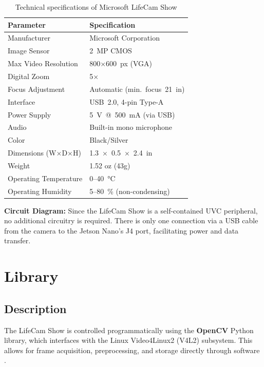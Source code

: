 \begin{table}[H]
	\centering
	\caption{Technical specifications of Microsoft LifeCam Show \cite{microsoft_lifecam_datasheet,techradar_lifecam_review}}
	\label{tab:lifecam_specs}
	\begin{tabular}{|p{4cm}|p{10cm}|}
		\hline
		\textbf{Parameter} & \textbf{Specification} \\ \hline
		Manufacturer & Microsoft Corporation \\ \hline
		Image Sensor & 2~MP \ac{CMOS} \\ \hline
		Max Video Resolution & 800$\times$600~px (VGA) \\ \hline
		Digital Zoom & 5$\times$ \\ \hline
		Focus Adjustment & Automatic (min.~focus~21~in) \\ \hline
		Interface & \ac{USB}~2.0, 4-pin Type-A \\ \hline
		Power Supply & 5~V~@~500~mA (via \ac{USB}) \\ \hline
		Audio & Built-in mono microphone \\ \hline
		Color & Black/Silver \\ \hline
		Dimensions (W$\times$D$\times$H) & 1.3~$\times$~0.5~$\times$~2.4~in \\ \hline
		Weight & 1.52 oz (43g) \\ \hline
		Operating Temperature & 0–40~°C \\ \hline
		Operating Humidity & 5–80~\% (non-condensing) \\ \hline
	\end{tabular}
\end{table}

\noindent\textbf{Circuit Diagram:}  
Since the LifeCam Show is a self-contained UVC peripheral, no additional circuitry is required. 
There is only one connection via a \ac{USB} cable from the camera to the Jetson Nano’s J4 port, facilitating power and data transfer.

\section{Library}
\subsection{Description}
The LifeCam Show is controlled programmatically using the \textbf{OpenCV} Python library, which interfaces with the Linux Video4Linux2 (V4L2) subsystem.  
This allows for frame acquisition, preprocessing, and storage directly through software \cite{opencv_doc_2024}.

